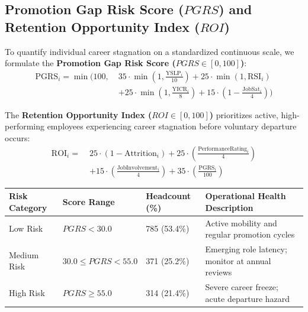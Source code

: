 \documentclass[12pt,a4paper,oneside]{article}
\begin{document}
\subsection{\texorpdfstring{Promotion Gap Risk Score ($PGRS$) and Retention Opportunity Index ($ROI$)}{Promotion Gap Risk Score and Retention Opportunity Index}}
To quantify individual career stagnation on a standardized continuous scale, we formulate the \textbf{Promotion Gap Risk Score ($PGRS \in [0, 100]$)}:
\begin{equation}
\begin{aligned}
\text{PGRS}_i = \min\Big(100, \; & 35 \cdot \min\left(1, \frac{\text{YSLP}_i}{10}\right) + 25 \cdot \min\left(1, \text{RSI}_i\right) \\
& + 25 \cdot \min\left(1, \frac{\text{YICR}_i}{8}\right) + 15 \cdot \left(1 - \frac{\text{JobSat}_i}{4}\right)\Big)
\end{aligned}
\end{equation}

The \textbf{Retention Opportunity Index ($ROI \in [0, 100]$)} prioritizes active, high-performing employees experiencing career stagnation before voluntary departure occurs:
\begin{equation}
\begin{aligned}
\text{ROI}_i = \; & 25 \cdot (1 - \text{Attrition}_i) + 25 \cdot \left(\frac{\text{PerformanceRating}_i}{4}\right) \\
& + 15 \cdot \left(\frac{\text{JobInvolvement}_i}{4}\right) + 35 \cdot \left(\frac{\text{PGRS}_i}{100}\right)
\end{aligned}
\end{equation}

\begin{center}
\fontsize{9}{11}\selectfont
\begin{tabular}{|C{2.5cm}|C{2.6cm}|C{2.5cm}|L{6.4cm}|}
\hline
\textbf{Risk Category} & \textbf{Score Range} & \textbf{Headcount (\%)} & \textbf{Operational Health Description} \\ \hline
Low Risk & $PGRS < 30.0$ & 785 (53.4\%) & Active mobility and regular promotion cycles \\ \hline
Medium Risk & $30.0 \le PGRS < 55.0$ & 371 (25.2\%) & Emerging role latency; monitor at annual reviews \\ \hline
High Risk & $PGRS \ge 55.0$ & 314 (21.4\%) & Severe career freeze; acute departure hazard \\ \hline
\end{tabular}
\vspace{0.02in}
\label{tab:pgrs_stratification}
\end{center}
\end{document}
